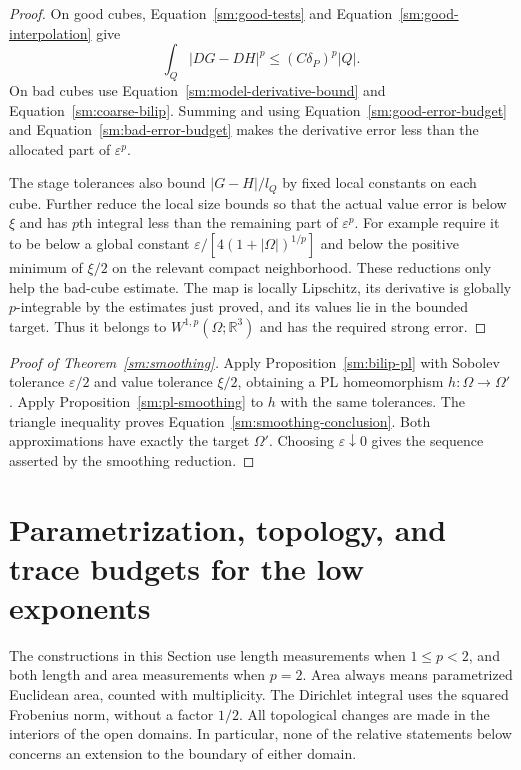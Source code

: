 \documentclass[11pt]{article}
\numberwithin{equation}{section}
\theoremstyle{definition}
\theoremstyle{remark}
\newcommand{\R}{\mathbb R}
\newcommand{\eps}{\varepsilon}
\begin{document}
\begin{proof}
On good cubes, Equation~\eqref{sm:good-tests} and
Equation~\eqref{sm:good-interpolation} give
\[
 \int_Q|DG-DH|^p\le(C\delta_P)^p|Q|.
\]
On bad cubes use
Equation~\eqref{sm:model-derivative-bound} and
Equation~\eqref{sm:coarse-bilip}.  Summing and
using Equation~\eqref{sm:good-error-budget} and
Equation~\eqref{sm:bad-error-budget} makes the
derivative error less than the allocated
part of $\eps^p$.

The stage tolerances also bound
$|G-H|/l_Q$ by fixed local constants
on each cube.  Further reduce the
local size bounds so that the actual
value error is below $\xi$ and has
$p$th integral less than the remaining
part of $\eps^p$.  For example require
it to be below a global constant
$\eps/[4(1+|\Omega|)^{1/p}]$ and below
the positive minimum of $\xi/2$ on
the relevant compact neighborhood.
These reductions only help the bad-cube
estimate.  The map is locally Lipschitz,
its derivative is globally $p$-integrable
by the estimates just proved, and its
values lie in the bounded target.
Thus it belongs to $W^{1,p}(\Omega;\R^3)$
and has the required strong error.
\end{proof}

\begin{proof}[Proof of Theorem~\ref{sm:smoothing}]
Apply Proposition~\ref{sm:bilip-pl} with
Sobolev tolerance $\eps/2$ and value
tolerance $\xi/2$, obtaining a PL
homeomorphism $h:\Omega\to\Omega'$.
Apply Proposition~\ref{sm:pl-smoothing}
to $h$ with the same tolerances.
The triangle inequality proves
Equation~\eqref{sm:smoothing-conclusion}.
Both approximations have exactly the
target $\Omega'$.  Choosing
$\eps\downarrow0$ gives the sequence
asserted by the smoothing reduction.
\end{proof}

\section{Parametrization, topology, and trace budgets for the low exponents}
\label{lt:section}\label{sec:low-tools}

The constructions in this Section use length measurements when
$1\leq p<2$, and both length and area measurements when $p=2$.
Area always means parametrized Euclidean area, counted with multiplicity.
The Dirichlet integral uses the squared Frobenius norm, without a factor
$1/2$.  All topological changes are made in the interiors of the open
domains.  In particular, none of the relative statements below concerns
an extension to the boundary of either domain.
\end{document}
